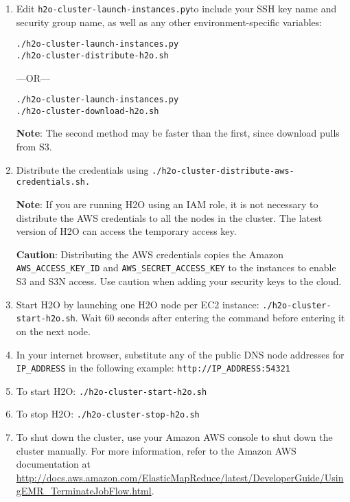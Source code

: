 \begin{enumerate}

\item Edit {\texttt{h2o-cluster-launch-instances.py}}to include your SSH key name and security group name, as well as any other environment-specific variables: 

\begin{lstlisting}[style=Python]
./h2o-cluster-launch-instances.py
./h2o-cluster-distribute-h2o.sh
\end{lstlisting}

 ---OR---

\begin{lstlisting}[style=Python]
./h2o-cluster-launch-instances.py
./h2o-cluster-download-h2o.sh
\end{lstlisting}

{\textbf{Note}}: The second method may be faster than the first, since download pulls from S3. 

\item Distribute the credentials using {\texttt{./h2o-cluster-distribute-aws-credentials.sh.}}

{\textbf{Note}}: If you are running H2O using an IAM role, it is not necessary to distribute the AWS credentials to all the nodes in the cluster. The latest version of H2O can access the temporary access key. 

{\textbf{Caution}}: Distributing the AWS credentials copies the Amazon {\texttt{AWS\_ACCESS\_KEY\_ID}} and {\texttt{AWS\_SECRET\_ACCESS\_KEY}} to the instances to enable S3 and S3N access. Use caution when adding your security keys to the cloud. 

\item Start H2O by launching one H2O node per EC2 instance: {\texttt{./h2o-cluster-start-h2o.sh}}. Wait 60 seconds after entering the command before entering it on the next node. 

\item In your internet browser, substitute any of the public DNS node addresses for {\texttt{IP\_ADDRESS}} in the following example: {\texttt{http://IP\_ADDRESS:54321}}

\item To start H2O: {\texttt{./h2o-cluster-start-h2o.sh}}

\item To stop H2O: {\texttt{./h2o-cluster-stop-h2o.sh}}

\item To shut down the cluster, use your Amazon AWS console to shut down the cluster manually. For more information, refer to the Amazon AWS documentation at {\url{http://docs.aws.amazon.com/ElasticMapReduce/latest/DeveloperGuide/UsingEMR_TerminateJobFlow.html}}. 

\end{enumerate}

